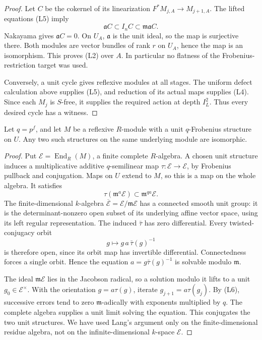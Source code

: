 \begin{proof}
Let \(C\) be the cokernel of its linearization
\(F^*M_{j,A}\to M_{j+1,A}\).
The lifted equations (L5) imply
\[
 \mathfrak a C\subset I_nC\subset\mathfrak m\mathfrak a C.
\]
Nakayama gives \(\mathfrak a C=0\). On \(U_A\),
\(\mathfrak a\) is the unit ideal, so the map is surjective there.
Both modules are vector bundles of rank \(r\) on \(U_A\), hence
the map is an isomorphism. This proves (L2) over \(A\).
In particular no flatness of the Frobenius-restriction target
was used.

Conversely, a unit cycle gives reflexive modules at all stages.
The uniform defect calculation above supplies (L5), and reduction
of its actual maps supplies (L4). Since each \(M_j\) is \(S\)-free,
it supplies the required action at depth \(I_L^2\).
Thus every desired cycle has a witness.
\end{proof}

\begin{lemma}
\label{D:local-complete-Lang}
Let \(q=p^f\), and let \(M\) be a reflexive \(R\)-module with a unit
\(q\)-Frobenius structure on \(U\).
Any two such structures on the same underlying module are isomorphic.
\end{lemma}

\begin{proof}
Put \(\mathcal E=\operatorname{End}_R(M)\), a finite complete
\(R\)-algebra. A chosen unit structure induces a multiplicative
additive \(q\)-semilinear map
\(\tau:\mathcal E\to\mathcal E\), by Frobenius pullback and conjugation.
Maps on \(U\) extend to \(M\), so this is a map on the whole algebra.
It satisfies
\[
 \tau(\mathfrak m^a\mathcal E)\subset
       \mathfrak m^{qa}\mathcal E.
 \tag{L6}
\]
The finite-dimensional \(k\)-algebra
\(\overline{\mathcal E}=\mathcal E/\mathfrak m\mathcal E\)
has a connected smooth unit group: it is the determinant-nonzero
open subset of its underlying affine vector space, using its
left regular representation. The induced \(\bar\tau\) has zero
differential. Every twisted-conjugacy orbit
\[
 g\longmapsto g\,a\,\bar\tau(g)^{-1}
\]
is therefore open, since its orbit map has invertible differential.
Connectedness forces a single orbit. Hence the equation
\(a=g\bar\tau(g)^{-1}\) is solvable modulo \(\mathfrak m\).

The ideal \(\mathfrak m\mathcal E\) lies in the Jacobson radical,
so a solution modulo it lifts to a unit \(g_0\in\mathcal E^\times\).
With the orientation \(g=a\tau(g)\), iterate
\(g_{j+1}=a\tau(g_j)\). By (L6), successive errors tend to zero
\(\mathfrak m\)-adically with exponents multiplied by \(q\).
The complete algebra supplies a unit limit solving the equation.
This conjugates the two unit structures. We have used Lang's
argument only on the finite-dimensional residue algebra, not on
the infinite-dimensional \(k\)-space \(\mathcal E\).
\end{proof}

